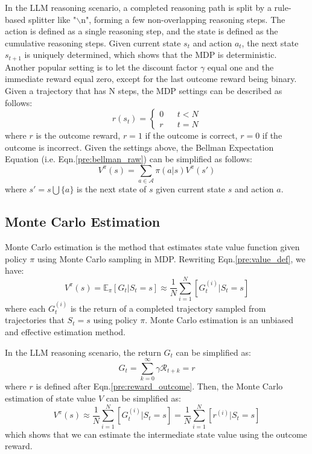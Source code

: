 In the LLM reasoning scenario, a completed reasoning path is split by a rule-based splitter like "$\backslash$n", forming a few non-overlapping reasoning steps. The action is defined as a single reasoning step, and the state is defined as the cumulative reasoning steps. Given current state $s_t$ and action $a_t$, the next state $s_{t+1}$ is uniquely determined, which shows that the MDP is deterministic. Another popular setting is to let the discount factor $\gamma$ equal one and the immediate reward equal zero, except for the last outcome reward being binary. Given a trajectory that has N steps, the MDP settings can be described as follows:
\begin{equation}\label{pre:reward_outcome}
    r(s_t)=\left\{
    \begin{aligned}
        0 & & {t<N} \\
        r & & {t=N}
    \end{aligned}
    \right.
\end{equation}
where $r$ is the outcome reward, $r=1$ if the outcome is correct, $r=0$ if the outcome is incorrect. Given the settings above, the Bellman Expectation Equation (i.e. Eqn.\ref{pre:bellman_raw}) can be simplified as follows:
\begin{equation}\label{pre:value_neigh}
    V^\pi(s)=\sum_{a\in\mathcal{A}}\pi(a|s)V^\pi(s')
\end{equation}
where $s'=s\bigcup\{a\}$ is the next state of $s$ given current state $s$ and action $a$.

\subsection{Monte Carlo Estimation}
Monte Carlo estimation is the method that estimates state value function given policy $\pi$ using Monte Carlo sampling in MDP. Rewriting Eqn.\ref{pre:value_def}, we have:
\begin{equation}
    V^\pi(s)=\mathbb{E}_\pi[G_t|S_t=s]\approx\frac{1}{N}\sum_{i=1}^N [G_t^{(i)}|S_t=s]
\end{equation}
where each $G_t^{(i)}$ is the return of a completed trajectory sampled from trajectories that $S_t=s$ using policy $\pi$. Monte Carlo estimation is an unbiased and effective estimation method. 

In the LLM reasoning scenario, the return $G_t$ can be simplified as:
\begin{equation}
    G_t=\sum_{k=0}^{\infty}\gamma \mathcal{R}_{t+k}=r
\end{equation}
where $r$ is defined after Eqn.\ref{pre:reward_outcome}. Then, the Monte Carlo estimation of state value $V$ can be simplified as:
\begin{equation}
    V^\pi(s)\approx\frac{1}{N}\sum_{i=1}^N [G_t^{(i)}|S_t=s]=\frac{1}{N}\sum_{i=1}^N [r^{(i)}|S_t=s]
\end{equation}
which shows that we can estimate the intermediate state value using the outcome reward.

